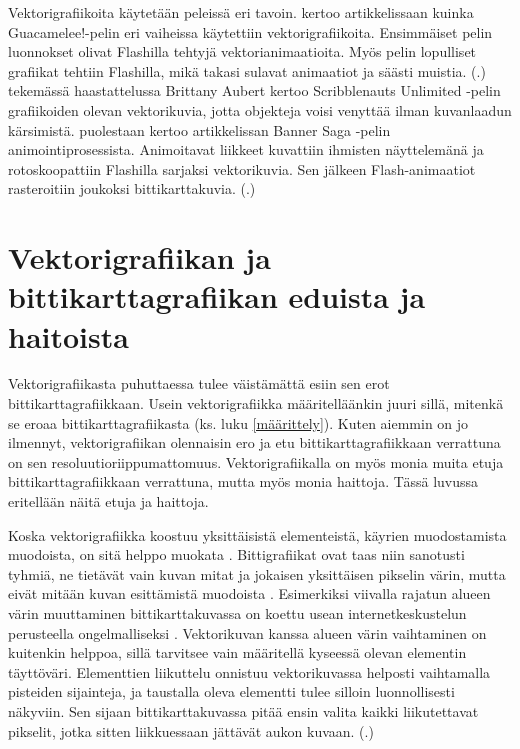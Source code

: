 \documentclass[utf8,bachelor]{gradu3}
\newcommand{\parencitedot}[1]{(\cite{#1}.)}
\begin{document}
Vektorigrafiikoita käytetään peleissä eri tavoin. \textcite{RefWorks:doc:5bdc818be4b0965708b5a0f0} kertoo artikkelissaan kuinka Guacamelee!-pelin eri vaiheissa käytettiin vektorigrafiikoita. Ensimmäiset pelin luonnokset olivat Flashilla tehtyjä vektorianimaatioita. Myös pelin lopulliset grafiikat tehtiin Flashilla, mikä takasi sulavat animaatiot ja säästi muistia. \parencitedot{RefWorks:doc:5bdc818be4b0965708b5a0f0} \textcite{RefWorks:doc:5bdc7473e4b05afcfde5d742} tekemässä haastattelussa Brittany Aubert kertoo Scribblenauts Unlimited -pelin grafiikoiden olevan vektorikuvia, jotta objekteja voisi venyttää ilman kuvanlaadun kärsimistä. \textcite{RefWorks:doc:5bd88176e4b0afdabde2b8e2} puolestaan kertoo artikkelissan Banner Saga -pelin animointiprosessista. Animoitavat liikkeet kuvattiin ihmisten näyttelemänä ja rotoskoopattiin Flashilla sarjaksi vektorikuvia. Sen jälkeen Flash-animaatiot rasteroitiin joukoksi bittikarttakuvia. \parencitedot{RefWorks:doc:5bd88176e4b0afdabde2b8e2}

\section{Vektorigrafiikan ja bittikarttagrafiikan eduista ja haitoista}\label{vertailu}


Vektorigrafiikasta puhuttaessa tulee väistämättä esiin sen erot bittikarttagrafiikkaan. Usein vektorigrafiikka määritelläänkin juuri sillä, mitenkä se eroaa bittikarttagrafiikasta (ks. luku \ref{määrittely}). Kuten aiemmin on jo ilmennyt, vektorigrafiikan olennaisin ero ja etu bittikarttagrafiikkaan verrattuna on sen resoluutioriippumattomuus. Vektorigrafiikalla on myös monia muita etuja bittikarttagrafiikkaan verrattuna, mutta myös monia haittoja. Tässä luvussa eritellään näitä etuja ja haittoja.

Koska vektorigrafiikka koostuu yksittäisistä elementeistä, käyrien muodostamista muodoista, on sitä helppo muokata \parencite{RefWorks:doc:5bdc5224e4b05afcfde5b159}. Bittigrafiikat ovat taas niin sanotusti tyhmiä, ne tietävät vain kuvan mitat ja jokaisen yksittäisen pikselin värin, mutta eivät mitään kuvan esittämistä muodoista \parencite{RefWorks:doc:5bdc5292e4b05afcfde5b171}. Esimerkiksi viivalla rajatun alueen värin muuttaminen bittikarttakuvassa on koettu usean internetkeskustelun perusteella ongelmalliseksi \parencites{RefWorks:doc:5bdf1069e4b0a1f99c63c515}{RefWorks:doc:5bdf10ece4b0273295d72f8a}{RefWorks:doc:5bdf119fe4b0b329c55e47c9}. Vektorikuvan kanssa alueen värin vaihtaminen on kuitenkin helppoa, sillä tarvitsee vain määritellä kyseessä olevan elementin täyttöväri. Elementtien liikuttelu onnistuu vektorikuvassa helposti vaihtamalla pisteiden sijainteja, ja taustalla oleva elementti tulee silloin luonnollisesti näkyviin. Sen sijaan bittikarttakuvassa pitää ensin valita kaikki liikutettavat pikselit, jotka sitten liikkuessaan jättävät aukon kuvaan. \parencitedot{RefWorks:doc:5bdc5224e4b05afcfde5b159}
\end{document}
